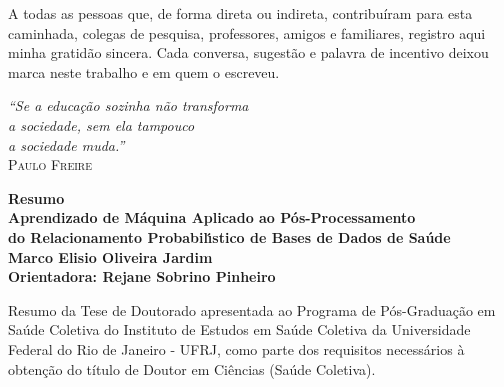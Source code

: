 \documentclass[12pt,a4paper,openany]{book}
\begin{document}
A todas as pessoas que, de forma direta ou indireta, contribuíram para esta
caminhada, colegas de pesquisa, professores, amigos e familiares,
registro aqui minha gratidão sincera. Cada conversa, sugestão e palavra de
incentivo deixou marca neste trabalho e em quem o escreveu.






\newpage

\thispagestyle{empty}

\vspace*{\fill}

\begin{flushright}
\textit{``Se a educação sozinha não transforma\\
a sociedade, sem ela tampouco\\
a sociedade muda.''}\\[6pt]
\textsc{Paulo Freire}
\end{flushright}





\newpage

\noindent

\vspace*{20pt}
\begin{center}
{\LARGE\bf Resumo}\\
\vspace{15pt}
{\Large\bf Aprendizado de M\'aquina Aplicado ao P\'os-Processamento\\do Relacionamento Probabil\'{\i}stico de Bases de Dados de Sa\'ude}\\
\vspace{6pt}
{\bf Marco Elisio Oliveira Jardim}\\
\vspace{12pt}
{\bf Orientadora: Rejane Sobrino Pinheiro}\\
\vspace{20pt}
\parbox{14cm}{Resumo da Tese de Doutorado apresentada ao Programa de Pós-Graduação em Saúde Coletiva do Instituto de Estudos em Saúde Coletiva da Universidade Federal do Rio de Janeiro - UFRJ, como parte dos requisitos necessários à obtenção do título de Doutor em Ciências (Saúde Coletiva).}
\end{center}
\vspace*{35pt}
\end{document}
